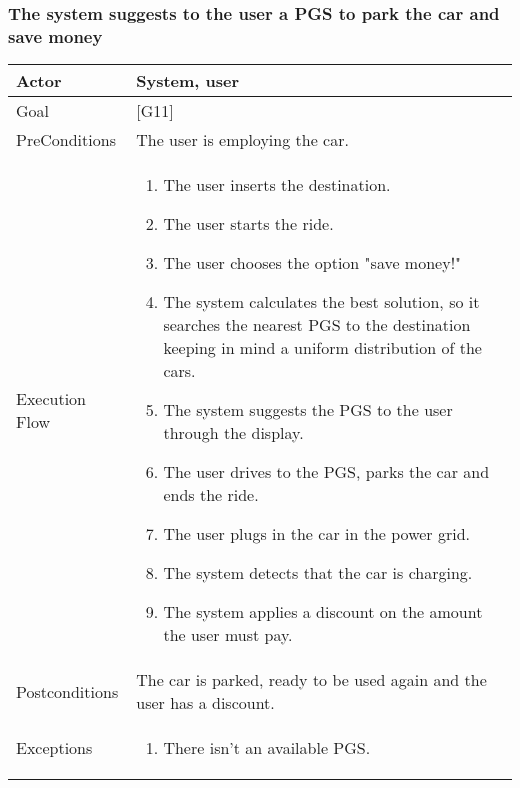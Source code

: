 \documentclass{article}
\begin{document}
	\subsubsection{The system suggests to the user a PGS to park the car and save money}
	\begin{tabularx}{\textwidth}{  l  X  }
		\hline
		Actor & System, user\\
		\hline
		Goal & [G11]\\
		\hline
		PreConditions & The user is employing the car.\\
		\hline
		Execution Flow & \begin{enumerate}
			\item{The user inserts the destination.}
                     \item{The user starts the ride.}
                     \item{The user chooses the option "save money!"}
										 \item{The system calculates the best solution, so it searches the nearest PGS to the destination keeping in mind a uniform distribution of the cars.}
										 \item{The system suggests the PGS to the user through the display.}
										 \item{The user drives to the PGS, parks the car and ends the ride.}
										 \item{The user plugs in the car in the power grid.}
										 \item{The system detects that the car is charging.}
										 \item{The system applies a discount on the amount the user must pay.}
										\end{enumerate}\\
		\hline
		Postconditions & The car is parked, ready to be used again and the user has a discount.\\
		\hline
		Exceptions & \begin{enumerate}
			\item{There isn't an available PGS.}
	\end{enumerate}\\
		\hline
	\end{tabularx}
\end{document}
